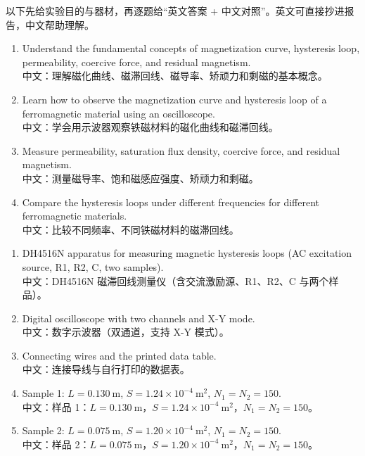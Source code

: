 \documentclass[11pt]{ctexart}
\begin{document}

以下先给实验目的与器材，再逐题给“英文答案 + 中文对照”。英文可直接抄进报告，中文帮助理解。


\begin{enumerate}
\item Understand the fundamental concepts of magnetization curve, hysteresis loop, permeability, coercive force, and residual magnetism.\\
中文：理解磁化曲线、磁滞回线、磁导率、矫顽力和剩磁的基本概念。
\item Learn how to observe the magnetization curve and hysteresis loop of a ferromagnetic material using an oscilloscope.\\
中文：学会用示波器观察铁磁材料的磁化曲线和磁滞回线。
\item Measure permeability, saturation flux density, coercive force, and residual magnetism.\\
中文：测量磁导率、饱和磁感应强度、矫顽力和剩磁。
\item Compare the hysteresis loops under different frequencies for different ferromagnetic materials.\\
中文：比较不同频率、不同铁磁材料的磁滞回线。
\end{enumerate}


\begin{enumerate}
\item DH4516N apparatus for measuring magnetic hysteresis loops (AC excitation source, R1, R2, C, two samples).\\
中文：DH4516N 磁滞回线测量仪（含交流激励源、R1、R2、C 与两个样品）。
\item Digital oscilloscope with two channels and X-Y mode.\\
中文：数字示波器（双通道，支持 X-Y 模式）。
\item Connecting wires and the printed data table.\\
中文：连接导线与自行打印的数据表。
\item Sample 1: \(L=0.130\ \mathrm{m}\), \(S=1.24\times10^{-4}\ \mathrm{m^2}\), \(N_1=N_2=150\).\\
中文：样品 1：\(L=0.130\ \mathrm{m}\)，\(S=1.24\times10^{-4}\ \mathrm{m^2}\)，\(N_1=N_2=150\)。
\item Sample 2: \(L=0.075\ \mathrm{m}\), \(S=1.20\times10^{-4}\ \mathrm{m^2}\), \(N_1=N_2=150\).\\
中文：样品 2：\(L=0.075\ \mathrm{m}\)，\(S=1.20\times10^{-4}\ \mathrm{m^2}\)，\(N_1=N_2=150\)。
\end{enumerate}
\end{document}
